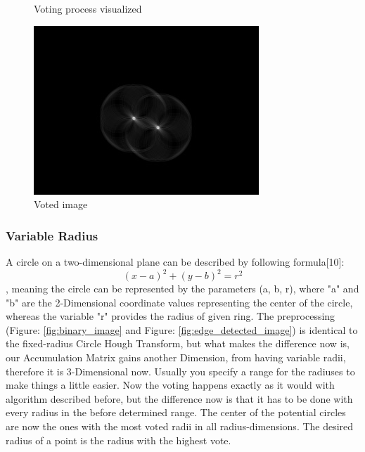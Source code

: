 \begin{figure}[H]
	\caption{Voting process visualized\cite{hough2}}\label{fig:circlehough_explanation}
	\endminipage
	\hfill
	\includegraphics[width=\linewidth]{images/hough_circle.jpg}
	\caption{Voted image \cite{hough3}}\label{fig:voted_image}
	\endminipage
\end{figure}

\subsubsection{Variable Radius}
A circle on a two-dimensional plane can be described by following formula[10]: \[ (x - a)^2 + (y - b)^2 = r^2  \]
, meaning the circle can be represented by the parameters (a, b, r), where "a" and "b" are the 2-Dimensional coordinate values representing the center of the circle, whereas the variable "r" provides the radius of given ring. \newline
The preprocessing (Figure: \ref{fig:binary_image} and Figure: \ref{fig:edge_detected_image}) is identical to the fixed-radius Circle Hough Transform, but what makes the difference now is, our Accumulation Matrix gains another Dimension, from having variable radii, therefore it is 3-Dimensional now. Usually you specify a range for the radiuses to make things a little easier. Now the voting happens exactly as it would with algorithm described before, but the difference now is that it has to be done with every radius in the before determined range. The center of the potential circles are now the ones with the most voted radii in all radius-dimensions. The desired radius of a point is the radius with the highest vote.

